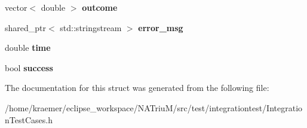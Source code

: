 \begin{DoxyCompactItemize}
\item 
\hypertarget{structnatrium_1_1IntegrationTestCases_1_1TestResult_ac38f2c7a01b0e0501cadf4775bc26572}{vector$<$ double $>$ {\bfseries outcome}}\label{structnatrium_1_1IntegrationTestCases_1_1TestResult_ac38f2c7a01b0e0501cadf4775bc26572}

\item 
\hypertarget{structnatrium_1_1IntegrationTestCases_1_1TestResult_aac009d7342e7af46b75432b4f43b0226}{shared\-\_\-ptr$<$ std\-::stringstream $>$ {\bfseries error\-\_\-msg}}\label{structnatrium_1_1IntegrationTestCases_1_1TestResult_aac009d7342e7af46b75432b4f43b0226}

\item 
\hypertarget{structnatrium_1_1IntegrationTestCases_1_1TestResult_af8b68ac3c5257163877d52c06d599424}{double {\bfseries time}}\label{structnatrium_1_1IntegrationTestCases_1_1TestResult_af8b68ac3c5257163877d52c06d599424}

\item 
\hypertarget{structnatrium_1_1IntegrationTestCases_1_1TestResult_abfd745aedfa8bfb6c6f2d93f61294954}{bool {\bfseries success}}\label{structnatrium_1_1IntegrationTestCases_1_1TestResult_abfd745aedfa8bfb6c6f2d93f61294954}

\end{DoxyCompactItemize}


The documentation for this struct was generated from the following file\-:\begin{DoxyCompactItemize}
\item 
/home/kraemer/eclipse\-\_\-workspace/\-N\-A\-Triu\-M/src/test/integrationtest/Integration\-Test\-Cases.\-h\end{DoxyCompactItemize}
